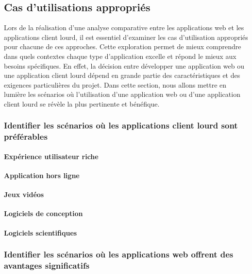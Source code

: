 \documentclass[a4paper, 12pt, french]{article}
\begin{document}
		\subsection{Cas d'utilisations appropriés}
			Lors de la réalisation d'une analyse comparative entre les applications web et les applications client lourd, il est essentiel d'examiner les cas d'utilisation appropriés pour chacune de ces approches. Cette exploration permet de mieux comprendre dans quels contextes chaque type d'application excelle et répond le mieux aux besoins spécifiques. En effet, la décision entre développer une application web ou une application client lourd dépend en grande partie des caractéristiques et des exigences particulières du projet. Dans cette section, nous allons mettre en lumière les scénarios où l'utilisation d'une application web ou d'une application client lourd se révèle la plus pertinente et bénéfique.

			\subsubsection{Identifier les scénarios où les applications client lourd sont préférables}
				\paragraph{Expérience utilisateur riche\\}
				\paragraph{Application hors ligne\\}
				\paragraph{Jeux vidéos\\}%
				\paragraph{Logiciels de conception\\}
				\paragraph{Logiciels scientifiques\\}%

			\subsubsection{Identifier les scénarios où les applications web offrent des avantages significatifs}	
\end{document}
